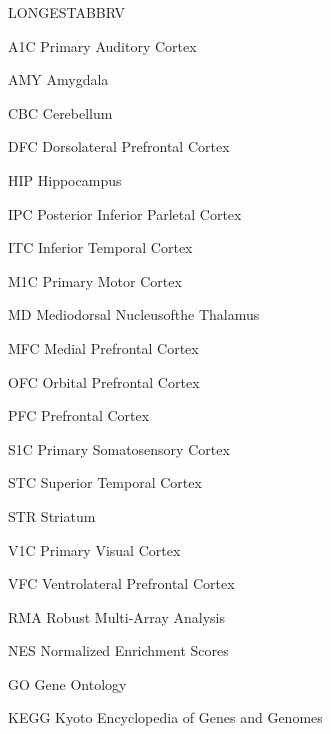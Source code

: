 \begin{theglossary}{LONGESTABBRV}

\item[A1C] Primary Auditory Cortex
\item[AMY] Amygdala
\item[CBC] Cerebellum
\item[DFC] Dorsolateral Prefrontal Cortex
\item[HIP] Hippocampus
\item[IPC] Posterior Inferior Parletal Cortex
\item[ITC] Inferior Temporal Cortex
\item[M1C] Primary Motor Cortex
\item[MD] Mediodorsal Nucleusofthe Thalamus
\item[MFC] Medial Prefrontal Cortex
\item[OFC] Orbital Prefrontal Cortex
\item[PFC] Prefrontal Cortex
\item[S1C] Primary Somatosensory Cortex
\item[STC] Superior Temporal Cortex
\item[STR] Striatum
\item[V1C] Primary Visual Cortex
\item[VFC] Ventrolateral Prefrontal Cortex
\item[RMA] Robust Multi-Array Analysis 
\item[NES] Normalized Enrichment Scores
\item[GO] Gene Ontology
\item[KEGG] Kyoto Encyclopedia of Genes and Genomes

\end{theglossary}
